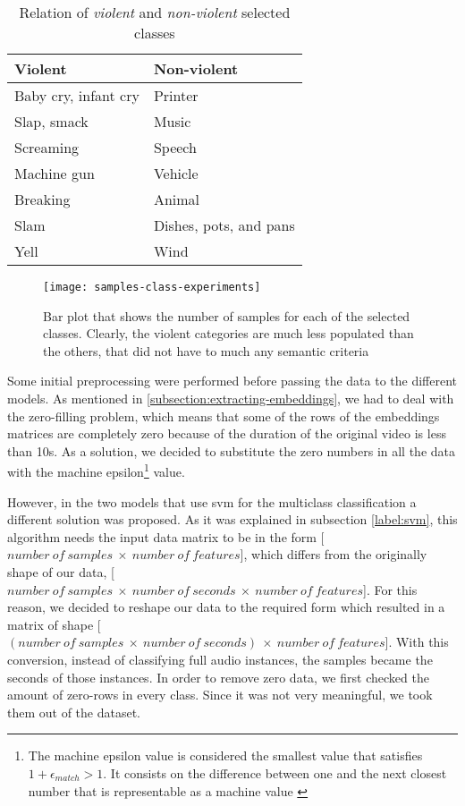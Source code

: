 	\begin{table}[ht]
		\centering
		\begin{tabular}{|| m{7em} | m{7em} ||}
			\hline
			\textbf{Violent} & \textbf{Non-violent} \\
			\hline\hline
			Baby cry, infant cry & Printer \\
			\hline
			Slap, smack & Music \\
			\hline
			Screaming & Speech \\
			\hline
			Machine gun & Vehicle \\
			\hline
			Breaking & Animal \\
			\hline
			Slam & Dishes, pots, and pans \\
			\hline
			Yell & Wind \\
			\hline
		\end{tabular}
	\caption{Relation of \textit{violent} and \textit{non-violent} selected classes}
	\label{table:7}
	\end{table}
	
	\begin{figure}[t]
		\centering
		\captionsetup{justification=centering}
		\texttt{[image: samples-class-experiments]}
		\caption{Bar plot that shows the number of samples for each of the selected classes. Clearly, the violent categories are much less populated than the others, that did not have to much any semantic criteria}
		\label{fig:mesh14}
	\end{figure}

	Some initial preprocessing were performed before passing the data to the different models. As mentioned in \ref{subsection:extracting-embeddings}, we had to deal with the zero-filling problem, which means that some of the rows of the embeddings matrices are completely zero because of the duration of the original video is less than 10s. As a solution, we decided to substitute the zero numbers in all the data with the machine epsilon\footnote{The machine epsilon value is considered the smallest value that satisfies $1 + \epsilon_{match} > 1$. It consists on the difference between one and the next closest number that is representable as a machine value \cite{Kaw}} value. 
	
	However, in the two models that use \acrshort{svm} for the multiclass classification a different solution was proposed. As it was explained in subsection \ref{label:svm}, this algorithm needs the input data matrix to be in the form [$number\ of\ samples\ \times\ number\ of\ features$], which differs from the originally shape of our data, [$number\ of\ samples\ \times\ number\ of\ seconds\ \times\ number\ of\ features$]. For this reason, we decided to reshape our data to the required form which resulted in a matrix of shape [$(number\ of\ samples\ \times\ number\ of\ seconds)\ \times\ number\ of\ features$]. With this conversion, instead of classifying full audio instances, the samples became the seconds of those instances. In order to remove zero data, we first checked the amount of zero-rows in every class. Since it was not very meaningful, we took them out of the dataset. 
	
